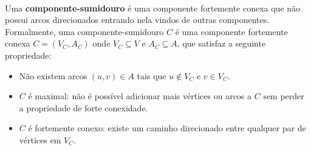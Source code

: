 \documentclass[12pt,a4paper]{article}
\begin{document}
\paragraph{}Uma \textbf{componente-sumidouro} é uma componente fortemente conexa que não possui arcos direcionados entrando nela vindos de outras componentes. Formalmente, uma componente-sumidouro \(C\) é uma componente fortemente conexa \(C = (V_C, A_C)\) onde \(V_C \subseteq V\) e \(A_C \subseteq A\), que satisfaz a seguinte propriedade:
\begin{itemize}
    \item Não existem arcos \((u, v) \in A\) tais que \(u \notin V_C\) e \(v \in V_C\).
    \item \(C\) é maximal: não é possível adicionar mais vértices ou arcos a \(C\) sem perder a propriedade de forte conexidade.
    \item \(C\) é fortemente conexo: existe um caminho direcionado entre qualquer par de vértices em \(V_C\).
\end{itemize}
\end{document}
